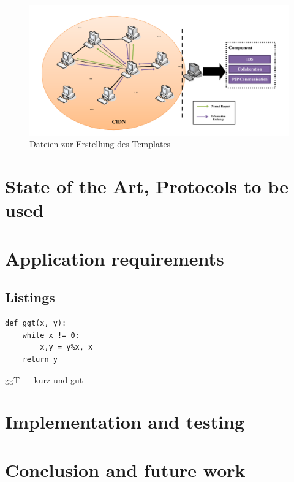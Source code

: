 \documentclass[11pt,a4paper]{report}
\begin{document}
\begin{figure}[htp]
\centering
\includegraphics[width=.9\textwidth]{images/cids}
\caption{Dateien zur Erstellung des Templates}
\label{fig:templateprozess}
\end{figure}



\chapter{State of the Art, Protocols to be used} \label{}


\chapter{Application requirements} \label{}


\section{Listings} \label{sec:listings}

\begin{listing}[htbp]
\begin{lstlisting}
def ggt(x, y):
    while x != 0:
        x,y = y%x, x
    return y
\end{lstlisting}
\caption{ggT --- kurz und gut}
\label{code:ggt}
\end{listing}


\chapter{Implementation and testing} \label{chap:stil}



\chapter{Conclusion and future work} \label{ch:conclusion}
\end{document}

